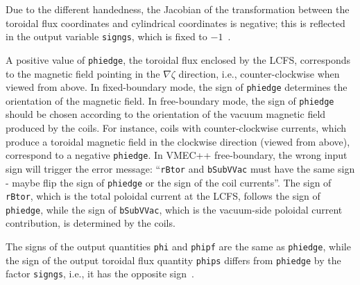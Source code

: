 Due to the different handedness, the Jacobian of the transformation between the toroidal flux
coordinates and cylindrical coordinates is negative;
this is reflected in the output variable \texttt{signgs}, which is fixed to $-1$~\cite{landreman_vmec_signs}.

A positive value of \texttt{phiedge}, the toroidal flux enclosed by the LCFS,
corresponds to the magnetic field pointing in the $\nabla\zeta$ direction,
i.e., counter-clockwise when viewed from above.
In fixed-boundary mode, the sign of \texttt{phiedge} determines the orientation of the magnetic field.
In free-boundary mode, the sign of \texttt{phiedge} should be chosen according to the orientation
of the vacuum magnetic field produced by the coils.
For instance, coils with counter-clockwise currents, which produce a toroidal magnetic field
in the clockwise direction (viewed from above), correspond to a negative \texttt{phiedge}. In VMEC++ free-boundary, the wrong input sign will trigger the error message:
``\texttt{rBtor} and \texttt{bSubVVac} must have the same sign
- maybe flip the sign of \texttt{phiedge} or the sign of the coil currents''.
The sign of \texttt{rBtor}, which is the total poloidal current at the LCFS, follows the sign of \texttt{phiedge},
while the sign of \texttt{bSubVVac}, which is the vacuum-side poloidal current contribution, is determined by the coils.

The signs of the output quantities \texttt{phi} and \texttt{phipf} are the same as \texttt{phiedge},
while the sign of the output toroidal flux quantity \texttt{phips} differs from \texttt{phiedge}
by the factor \texttt{signgs}, i.e., it has the opposite sign~\cite{landreman_vmec_signs}.
